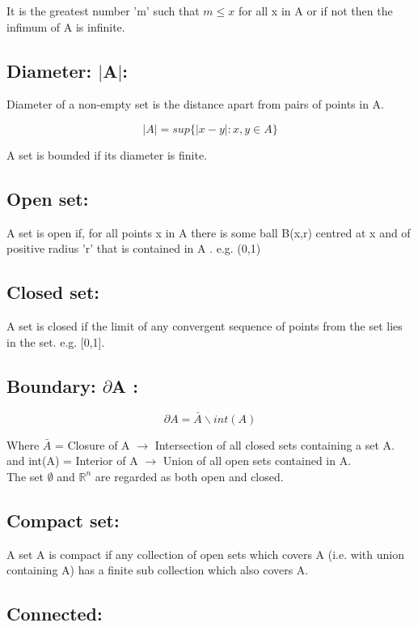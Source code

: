 \documentclass[14pt]{extarticle}
\begin{document}
\begin{enumerate}
It is the greatest number 'm' such that $m\leq x$ for all x in A or if not then the infimum of A is infinite.

\subsection{Diameter: $|$A$|$:}

Diameter of a non-empty set is the distance apart from pairs of points in A.

$$|A|= sup\{|x-y|: x,y \in A\}$$

A set is bounded if its diameter is finite.

\subsection{Open set:}

A set is open if, for all points x in A there is some ball B(x,r) centred at x and of positive radius 'r' that is contained in A . e.g. (0,1)

\subsection{Closed set:}

A set is closed if the limit of any convergent sequence of points from the set lies in the set. e.g. [0,1].

\subsection{Boundary: $\partial$A :}
$$\partial A = \bar{A} \backslash int(A)$$

Where $\bar{A}$ = Closure of A $\rightarrow$ Intersection of all closed sets containing a set A.\\
and int(A) = Interior of A $\rightarrow$ Union of all open sets contained in A.\\
The set $\emptyset$ and $\mathbb{R}^n$ are regarded as both open and closed.

\subsection{Compact set:}
A set A is compact if any collection of open sets which covers A (i.e. with union containing A) has a finite sub collection which also covers A.

\subsection{Connected:}


\end{enumerate}
\end{document}
